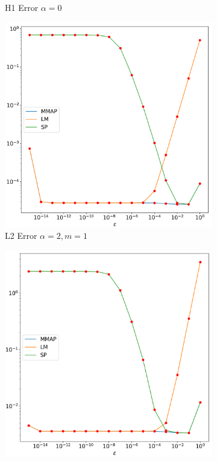 \documentclass[12pt]{ociamthesis}
\begin{document}
\begin{figure}[H]
\begin{subfigure}{0.44\textwidth}
     \caption{H1 Error $\alpha=0$}
 \end{subfigure}
 \begin{subfigure}{0.44\textwidth}
     \includegraphics[width=\textwidth]{Pics/LHSims/E1b_MMAP_LM_SPL2.png}
     \caption{L2 Error $\alpha=2, m=1$}
 \end{subfigure}
 \begin{subfigure}{0.44\textwidth}
     \includegraphics[width=\textwidth]{Pics/LHSims/E1b_MMAP_LM_SPH1.png}

\end{subfigure}
\end{figure}
\end{document}
